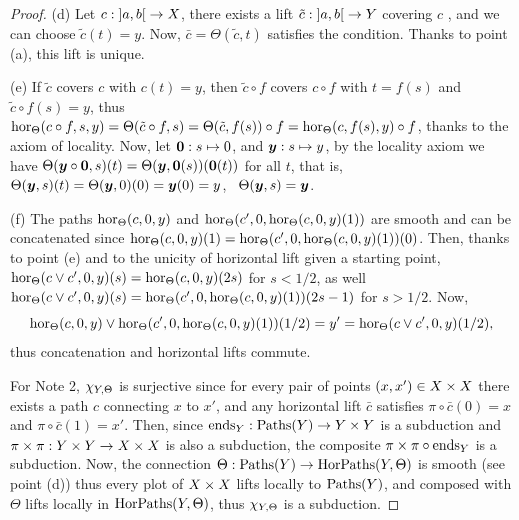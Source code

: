 \begin{proof}
  (d) Let $c : \left] a,b \right[ \to X$,
  there exists a lift $\tilde c : \left] a,b \right[ \to Y$ covering $c$ ,
  and we can choose $\tilde c(t) = y$.
  Now,
  $\bar c = \Theta(\tilde c,t)$ satisfies the condition.
  Thanks to point (a),
  this lift is unique.
  
  (e) If $\tilde c$ covers $c$ with $c(t) = y$,
  then $\tilde c \circ f$ covers $c \circ f$ with $t = f(s)$ and $\tilde c \circ f(s) = y$,
  thus $\operatorname{hor}_\Theta(c \circ f,s,y) = \Theta(\tilde c \circ f, s) = \Theta(\tilde c, f(s)) \circ f = \operatorname{hor}_\Theta(c,f(s),y) \circ f$,
  thanks to the axiom of locality.
  Now,
  let $\boldsymbol 0 : s \mapsto 0$,
  and ${\boldsymbol y} : s \mapsto y$,
  by the locality axiom we have $\Theta({\boldsymbol y} \circ \boldsymbol 0,s)(t) = \Theta({\boldsymbol y},\boldsymbol 0(s))(\boldsymbol 0(t))$ for all $t$,
  that is,
  $\Theta({\boldsymbol y},s)(t) = \Theta({\boldsymbol y},0)(0) = {\boldsymbol y}(0) = y$,
  \ie\ $\Theta({\boldsymbol y},s) = {\boldsymbol y}$.
  
  (f) The paths $\operatorname{hor}_\Theta(c,0,y)$ and $\operatorname{hor}_\Theta(c',0, \operatorname{hor}_\Theta(c,0,y)(1))$ are smooth and can be concatenated since $\operatorname{hor}_\Theta(c,0,y)(1) = \operatorname{hor}_\Theta(c',0, \operatorname{hor}_\Theta(c,0,y)(1))(0)$.
  Then,
  thanks to point (e) and to the unicity of horizontal lift given a starting point,
  $\operatorname{hor}_\Theta(c \vee c',0,y)(s) = \operatorname{hor}_\Theta(c,0,y)(2s)$ for $s <1/2$,
  as well $\operatorname{hor}_\Theta(c \vee c',0,y)(s) = \operatorname{hor}_\Theta(c',0, \operatorname{hor}_\Theta(c,0,y)(1))(2s - 1)$ for $s > 1/2$.
  Now,
  $$%
  \hor_\Theta(c,0,y) \vee \hor_\Theta(c',0, \hor_\Theta(c,0,y)(1))(1/2) = y' = \hor_\Theta(c \vee c',0,y)(1/2),
  $$%
  thus concatenation and horizontal lifts commute.
  
  For Note 2, $\chi_{Y,\Theta}$ is surjective since for every pair of points $(x,x') \in X \times X$ there exists a path $c$ connecting $x$ to $x'$,
  and any horizontal lift $\bar c$ satisfies $\pi \circ \bar c(0) = x$ and $\pi \circ \bar c(1) = x'$.
  Then,
  since $\operatorname{ends}_Y : \operatorname{Paths}(Y) \to Y \times Y$ is a subduction and $\pi \times \pi : Y \times Y \to X \times X$ is also a subduction,
  the composite $\pi \times \pi \circ \operatorname{ends}_Y$ is a subduction.
  Now,
  the connection $\Theta : \operatorname{Paths}(Y) \to \operatorname{HorPaths}(Y, \Theta)$ is smooth (see point (d)) thus every plot of $X \times X$ lifts locally to $\operatorname{Paths}(Y)$,
  and composed with $\Theta$ lifts locally in $\operatorname{HorPaths}(Y, \Theta)$,
  thus $\chi_{Y, \Theta}$ is a subduction.
\end{proof}

